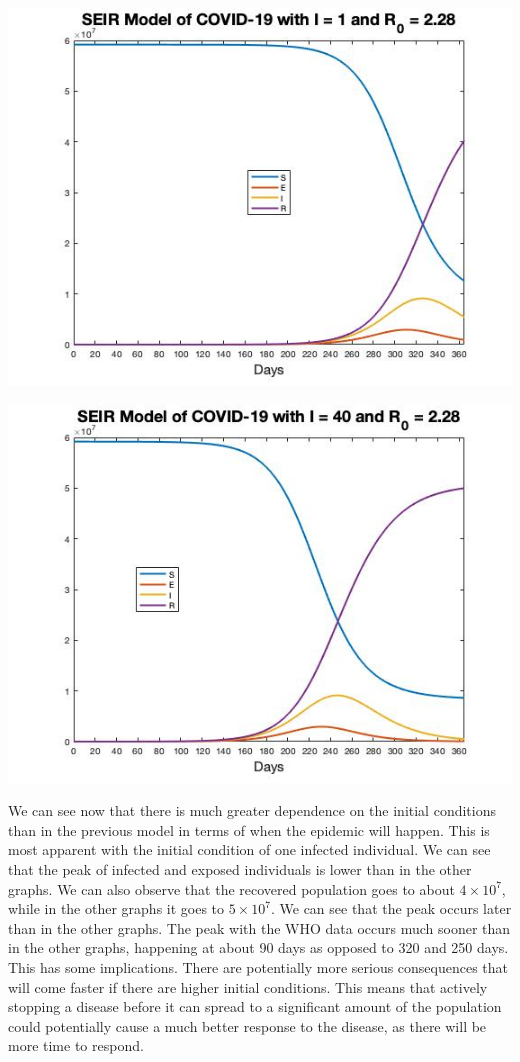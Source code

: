 \documentclass[12pt, a4paper]{article}
\begin{document}
        \includegraphics[scale=0.75]{plots/seir1r0.jpg}
        
        \includegraphics[scale=0.75]{plots/seir40r0.jpg}
        
       We can see now that there is much greater dependence on the initial conditions than in the previous model in terms of when the epidemic will happen. This is most apparent with the initial condition of one infected individual. We can see that the peak of infected and exposed individuals is lower than in the other graphs. We can also observe that the recovered population goes to about $4 \times 10^7$, while in the other graphs it goes to $5 \times 10^7$. We can see that the peak occurs later than in the other graphs. The peak with the WHO data occurs much sooner than in the other graphs, happening at about 90 days as opposed to 320 and 250 days. This has some implications. There are potentially more serious consequences that will come faster if there are higher initial conditions. This means that actively stopping a disease before it can spread to a significant amount of the population could potentially cause a much better response to the disease, as there will be more time to respond.
       
\end{document}

